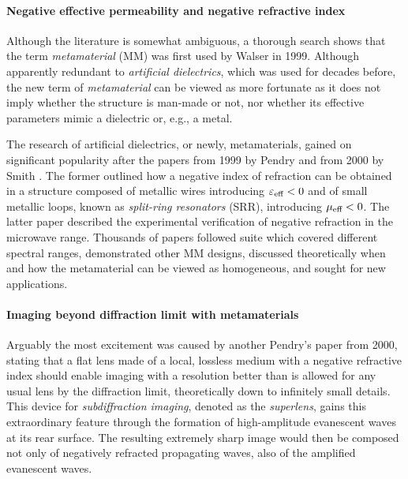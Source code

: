 \paragraph{Negative effective permeability and negative refractive index}  %
Although the literature is somewhat ambiguous, a thorough search shows that the term \textit{metamaterial} (MM) was first used by Walser in 1999. Although apparently redundant to \textit{artificial dielectrics}, which was used for decades before,  the new term of \textit{metamaterial} can be viewed as more fortunate as it does not imply whether the structure is man-made or not, nor whether its effective parameters mimic a dielectric or, e.g., a metal.

The research of artificial dielectrics, or newly, metamaterials, gained on significant popularity after the papers from 1999 by Pendry \cite{pendry1999magnetism} and from 2000 by Smith \cite{smith2000composite}. The former outlined how a negative index of refraction can be obtained in a structure composed of metallic wires introducing $\varepsilon_{\text{eff} }<0$ and of small metallic loops, known as \textit{split-ring resonators} (SRR), introducing $\mu_{\text{eff} }<0$. The latter paper described the experimental verification of negative refraction in the microwave range. Thousands of papers followed suite which covered different spectral ranges, demonstrated other MM designs, discussed theoretically when and how the metamaterial can be viewed as homogeneous, and sought for new applications. 

\paragraph{Imaging beyond diffraction limit with metamaterials} %
Arguably the most excitement was caused by another Pendry's paper \cite{pendry2000negative} from 2000, stating that a flat lens made of a local, lossless medium with a negative refractive index should enable imaging with a resolution better than is allowed for any usual lens by the diffraction limit, theoretically down to infinitely small details. This device for \textit{subdiffraction imaging}, denoted as the \textit{superlens}, gains this extraordinary feature through the formation of high-amplitude evanescent waves at its rear surface. The resulting extremely sharp image would then be composed not only of negatively refracted propagating waves, also of the amplified evanescent waves.

